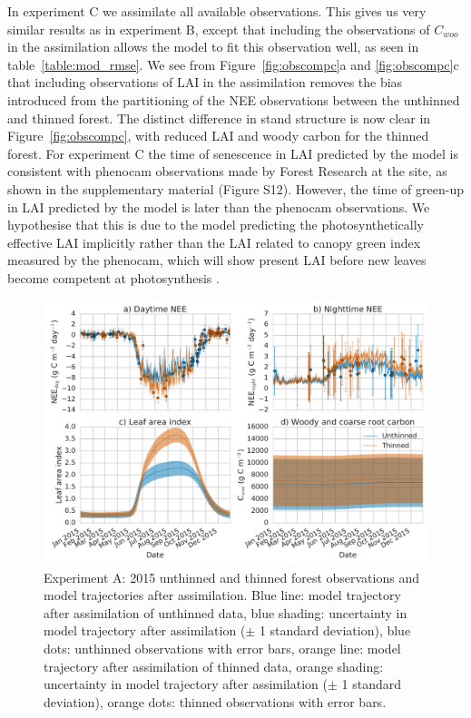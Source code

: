 In experiment C we assimilate all available observations. This gives us very similar results as in experiment B, except that including the observations of \(C_{woo}\) in the assimilation allows the model to fit this observation well, as seen in table~\ref{table:mod_rmse}. We see from Figure~\ref{fig:obscompc}a and \ref{fig:obscompc}c that including observations of LAI in the assimilation removes the bias introduced from the partitioning of the NEE observations between the unthinned and thinned forest. The distinct difference in stand structure is now clear in Figure~\ref{fig:obscompc}, with reduced LAI and woody carbon for the thinned forest. For experiment C the time of senescence in LAI predicted by the model is consistent with phenocam observations made by Forest Research at the site, as shown in the supplementary material (Figure S12). However, the time of green-up in LAI predicted by the model is later than the phenocam observations. We hypothesise that this is due to the model predicting the photosynthetically effective LAI implicitly rather than the LAI related to canopy green index measured by the phenocam, which will show present LAI before new leaves become competent at photosynthesis \citep{reich1991leaf, Morecroft2003}.   

\begin{figure}[ht]
    \centering
        \includegraphics[width=\textwidth]{chapter/chapter7/obs_compa.pdf}
\caption{Experiment A: 2015 unthinned and thinned forest observations and model trajectories after assimilation. Blue line: model trajectory after assimilation of unthinned data, blue shading: uncertainty in model trajectory after assimilation (\(\pm\) 1 standard deviation), blue dots: unthinned observations with error bars, orange line: model trajectory after assimilation of thinned data, orange shading: uncertainty in model trajectory after assimilation (\(\pm\) 1 standard deviation), orange dots: thinned observations with error bars.}
 \label{fig:obscompa}
 \end{figure}
 
